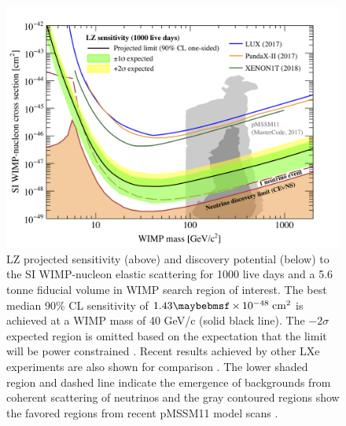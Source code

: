 {%
\begin{figure}[h!]
    \centering
    \includegraphics[scale=0.8]{Chapter_5/Figures/sensitivity_studies/lz_projection_1000_day.png}
    \caption[LZ projected sensitivity to the SI WIMP-nucleon elastic scattering for 1000 live days and a 5.6 tonne fiducial volume in WIMP search region of interest.]%
    {LZ projected sensitivity (above) and discovery potential (below) to the SI WIMP-nucleon elastic scattering for 1000 live days and a 5.6 tonne fiducial volume in WIMP search region of interest. The best median 90\% CL sensitivity of $1.43 \times 10^{-48} \; \MathText{cm}^2$ is achieved at a WIMP mass of 40 GeV/c\squared{} (solid black line). The $-2\sigma$ expected region is omitted based on the expectation that the limit will be power constrained \cite{Cowan:2011an}. Recent results achieved by other LXe experiments are also shown for comparison \cite{lux_full, xenon_1t, pandax_limit}. The lower shaded region and dashed line indicate the emergence of backgrounds from coherent scattering of neutrinos \cite{neutrino_floor} and the gray contoured regions show the favored regions from recent pMSSM11 model scans \cite{pMSSM11}.}
    \label{fig:projected_lz_sensitivity}
\end{figure}
%

}
